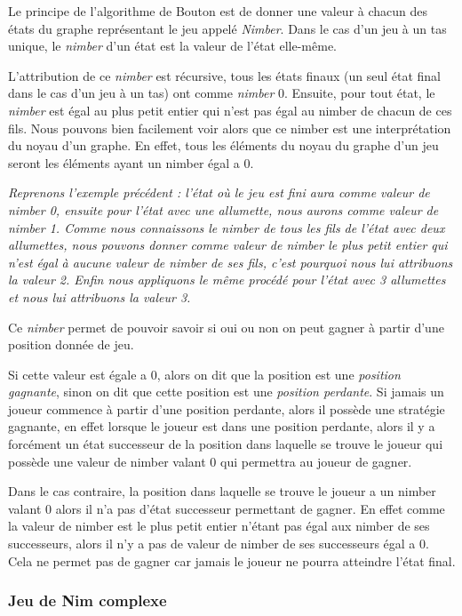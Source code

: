    Le principe de l'algorithme de Bouton est de donner une valeur à chacun des états du graphe représentant le jeu appelé \textit{Nimber}. Dans le cas d'un jeu \`a un tas unique, le \textit{nimber} d'un état est la valeur de l'état elle-même.

    L'attribution de ce \textit{nimber} est récursive, tous les états finaux (un seul état final dans le cas d'un jeu à un tas) ont comme \textit{nimber} 0. Ensuite, pour tout état, le \textit{nimber} est égal au plus petit entier qui n'est pas égal au nimber de chacun de ces fils. Nous pouvons bien facilement voir alors que ce nimber est une interprétation du noyau d'un graphe. En effet, tous les éléments du noyau du graphe d'un jeu seront les éléments ayant un nimber égal a 0.

    \textit {
    Reprenons l'exemple précédent : l’état où le jeu est fini aura comme valeur de nimber 0, ensuite pour l’état avec une allumette, nous aurons comme valeur de nimber 1. Comme nous connaissons le nimber de tous les fils de l’état avec deux allumettes, nous pouvons donner comme valeur de nimber le plus petit entier qui n'est égal à aucune valeur de nimber de ses fils, c'est pourquoi nous lui attribuons la valeur 2. Enfin nous appliquons le même procédé pour l’état avec 3 allumettes et nous lui attribuons la valeur 3.
    }

    Ce \textit{nimber} permet de pouvoir savoir si oui ou non on peut gagner à partir d'une position donnée de jeu.

    Si cette valeur est égale a 0, alors on dit que la position est une \textit{position gagnante}, sinon on dit que cette position est une \textit{position perdante}. Si jamais un joueur commence à partir d'une position perdante, alors il possède une stratégie gagnante, en effet lorsque le joueur est dans une position perdante, alors il y a forcément un état successeur de la position dans laquelle se trouve le joueur qui possède une valeur de nimber valant 0 qui permettra au joueur de gagner.

    Dans le cas contraire, la position dans laquelle se trouve le joueur a un nimber valant 0 alors il n'a pas d’état successeur permettant de gagner. En effet comme la valeur de nimber est le plus petit entier n’étant pas égal aux nimber de ses successeurs, alors il n'y a pas de valeur de nimber de ses successeurs égal a 0. Cela ne permet pas de gagner car jamais le joueur ne pourra atteindre l’état final.

  \subsubsection{Jeu de Nim complexe}
  \label{subsub:Jeu de Nim complexe}

